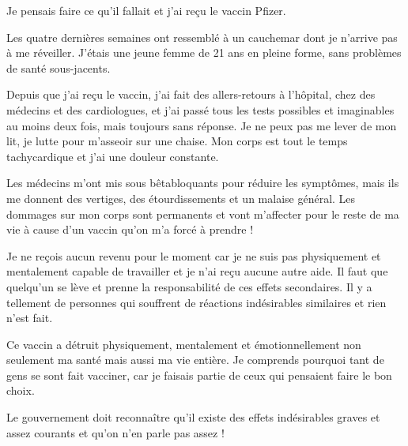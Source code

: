 Je pensais faire ce qu'il fallait et j'ai reçu le vaccin Pfizer.

Les quatre dernières semaines ont ressemblé à un cauchemar dont je n'arrive pas
à me réveiller. J'étais une jeune femme de 21 ans en pleine forme, sans
problèmes de santé sous-jacents.

Depuis que j'ai reçu le vaccin, j'ai fait des allers-retours à l'hôpital, chez
des médecins et des cardiologues, et j'ai passé tous les tests possibles et
imaginables au moins deux fois, mais toujours sans réponse. Je ne peux pas me
lever de mon lit, je lutte pour m'asseoir sur une chaise. Mon corps est tout le
temps tachycardique et j'ai une douleur constante.

Les médecins m'ont mis sous bêtabloquants pour réduire les symptômes, mais ils
me donnent des vertiges, des étourdissements et un malaise général. Les dommages
sur mon corps sont permanents et vont m'affecter pour le reste de ma vie à cause
d'un vaccin qu'on m'a forcé à prendre !

Je ne reçois aucun revenu pour le moment car je ne suis pas physiquement et
mentalement capable de travailler et je n'ai reçu aucune autre aide. Il faut que
quelqu'un se lève et prenne la responsabilité de ces effets secondaires. Il y a
tellement de personnes qui souffrent de réactions indésirables similaires et
rien n'est fait.

Ce vaccin a détruit physiquement, mentalement et émotionnellement non seulement
ma santé mais aussi ma vie entière. Je comprends pourquoi tant de gens se sont
fait vacciner, car je faisais partie de ceux qui pensaient faire le bon choix.

Le gouvernement doit reconnaître qu'il existe des effets indésirables graves et
assez courants et qu'on n'en parle pas assez !
